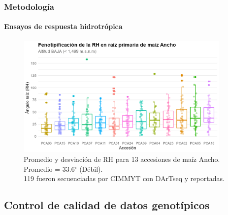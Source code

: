 \documentclass[9pt,aspectratio=169]{beamer}
\begin{document}
\begin{frame}
    \frametitle{Metodología}
    \framesubtitle{Ensayos de respuesta hidrotrópica}

    \begin{figure}
        \centering
        \includegraphics[height=60mm]{RH_BAJA.png}
        \caption{Promedio y desviación de RH para 13 accesiones de maíz Ancho. Promedio = 33.6$^{\circ}$ (Débil). \\ 119 fueron secuenciadas por CIMMYT con DArTseq y reportadas.}
        \label{fig:fenotipo}
    \end{figure}
        
\end{frame}


\subsection{Control de calidad de datos genotípicos}
\end{document}
